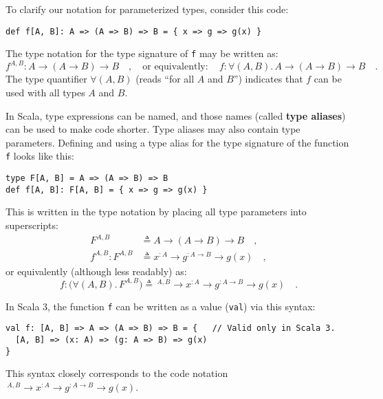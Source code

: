 To clarify our notation for parameterized types, consider this code:
\begin{lstlisting}
def f[A, B]: A => (A => B) => B = { x => g => g(x) }
\end{lstlisting}
The type notation for the type signature of \lstinline!f! may be
written as:
\[
f^{A,B}:A\rightarrow\left(A\rightarrow B\right)\rightarrow B\quad,\quad\text{or equivalently}:\quad f:\forall(A,B).\,A\rightarrow\left(A\rightarrow B\right)\rightarrow B\quad.
\]
The type quantifier $\forall(A,B)$ (reads \textsf{``}for all $A$ and $B$\textsf{''})
indicates that $f$ can be used with all types $A$ and $B$.

In Scala, type expressions can be named, and those names (called \textbf{type
aliases}) can be used to make code shorter. Type
aliases may also contain type parameters. Defining and using a type
alias for the type signature of the function \lstinline!f! looks
like this:
\begin{lstlisting}
type F[A, B] = A => (A => B) => B
def f[A, B]: F[A, B] = { x => g => g(x) }
\end{lstlisting}
This is written in the type notation by placing all type parameters
into superscripts:
\begin{align*}
F^{A,B} & \triangleq A\rightarrow\left(A\rightarrow B\right)\rightarrow B\quad,\\
f^{A,B}:F^{A,B} & \triangleq x^{:A}\rightarrow g^{:A\rightarrow B}\rightarrow g(x)\quad,
\end{align*}
or equivalently (although less readably) as:
\[
f:\big(\forall(A,B).\,F^{A,B}\big)\triangleq\,^{A,B}\rightarrow x^{:A}\rightarrow g^{:A\rightarrow B}\rightarrow g(x)\quad.
\]

In Scala 3, the function \lstinline!f! can be written as a value
(\lstinline!val!) via this syntax:
\begin{lstlisting}
val f: [A, B] => A => (A => B) => B = {   // Valid only in Scala 3.
  [A, B] => (x: A) => (g: A => B) => g(x)
}
\end{lstlisting}
This syntax closely corresponds to the code notation $\,^{A,B}\rightarrow x^{:A}\rightarrow g^{:A\rightarrow B}\rightarrow g(x)$.

